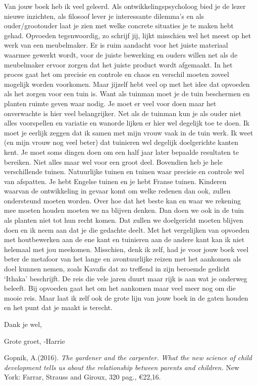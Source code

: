 \documentclass[]{book}
\begin{document}
Van jouw boek heb ik veel geleerd. Als ontwikkelingspsycholoog bied je
de lezer nieuwe inzichten, als filosoof lever je interessante dilemma's
en als ouder/grootouder laat je zien met welke concrete situaties je te
maken hebt gehad. Opvoeden tegenwoordig, zo schrijf jij, lijkt misschien
wel het meest op het werk van een meubelmaker. Er is ruim aandacht voor
het juiste materiaal waarmee gewerkt wordt, voor de juiste bewerking en
ouders willen net als de meubelmaker ervoor zorgen dat het juiste
product wordt afgemaakt. In het proces gaat het om precisie en controle
en chaos en verschil moeten zoveel mogelijk worden voorkomen. Maar
jijzelf hebt veel op met het idee dat opvoeden als het zorgen voor een
tuin is. Want als tuinman moet je de tuin beschermen en planten ruimte
geven waar nodig. Je moet er veel voor doen maar het onverwachte is hier
veel belangrijker. Net als de tuinman kun je als ouder niet alles
voorspellen en variatie en wanorde lijken er hier wel degelijk toe te
doen. Ik moet je eerlijk zeggen dat ik samen met mijn vrouw vaak in de
tuin werk. Ik weet (en mijn vrouw nog veel beter) dat tuinieren wel
degelijk doelgerichte kanten kent. Je moet soms dingen doen om een half
jaar later bepaalde resultaten te bereiken. Niet alles maar wel voor een
groot deel. Bovendien heb je hele verschillende tuinen. Natuurlijke
tuinen en tuinen waar precisie en controle wel van afspatten. Je hebt
Engelse tuinen en je hebt Franse tuinen. Kinderen waarvan de
ontwikkeling in gevaar komt om welke redenen dan ook, zullen ondersteund
moeten worden. Over hoe dat het beste kan en waar we rekening mee moeten
houden moeten we na blijven denken. Dan doen we ook in de tuin als
planten niet tot hun recht komen. Dat zullen we doelgericht moeten
blijven doen en ik neem aan dat je die gedachte deelt. Met het
vergelijken van opvoeden met houtbewerken aan de ene kant en tuinieren
aan de andere kant kan ik niet helemaal met jou meekomen. Misschien,
denk ik zelf, had je voor jouw boek veel beter de metafoor van het lange
en avontuurlijke reizen met het aankomen als doel kunnen nemen, zoals
Kavafis dat zo treffend in zijn beroemde gedicht `Ithaka' beschrijft. De
reis die vele jaren duurt maar rijk is aan wat je onderweg beleeft. Bij
opvoeden gaat het om het aankomen maar veel meer nog om die mooie reis.
Maar laat ik zelf ook de grote lijn van jouw boek in de gaten houden en
het punt dat je maakt is terecht.

Dank je wel,

Grote groet, -Harrie

Gopnik, A.(2016). \emph{The gardener and the carpenter. What the new
science of child development tells us about the relationship between
parents and children.} New York: Farrar, Strauss and Giroux, 320 pag.,
€22,16.
\end{document}
